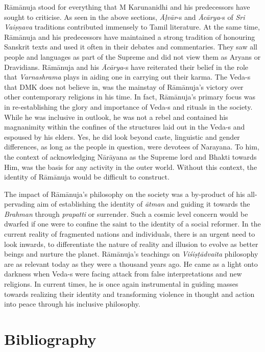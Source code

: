 Rāmānuja stood for everything that M Karunanidhi and his predecessors have sought to criticise. As seen in the above sections, \textit{Āḷvār}-s and \textit{Ācārya}-s of \textit{Sri Vaiṣņava} traditions contributed immensely to Tamil literature. At the same time, Rāmānuja and his predecessors have maintained a strong tradition of honouring Sanskrit texts and used it often in their debates and commentaries. They saw all people and languages as part of the Supreme and did not view them as Aryans or Dravidians. Rāmānuja and his \textit{Ācārya}-s have reiterated their belief in the role that \textit{Varnashrama} plays in aiding one in carrying out their karma. The Veda-s that DMK does not believe in, was the mainstay of Rāmānuja’s victory over other contemporary religions in his time. In fact, Rāmānuja’s primary focus was in re-establishing the glory and importance of Veda-s and rituals in the society. While he was inclusive in outlook, he was not a rebel and contained his magnanimity within the confines of the structures laid out in the Veda-s and espoused by his elders. Yes, he did look beyond caste, linguistic and gender differences, as long as the people in question, were devotees of Narayana. To him, the context of acknowledging Nārāyana as the Supreme lord and Bhakti towards Him, was the basis for any activity in the outer world. Without this context, the identity of Rāmānuja would be difficult to construct.

The impact of Rāmānuja’s philosophy on the society was a by-product of his all-pervading aim of establishing the identity of \textit{ātman} and guiding it towards the \textit{Brahman} through \textit{prapatti }or surrender. Such a cosmic level concern would be dwarfed if one were to confine the saint to the identity of a social reformer. In the current reality of fragmented nations and individuals, there is an urgent need to look inwards, to differentiate the nature of reality and illusion to evolve as better beings and nurture the planet. Rāmānuja’s teachings on \textit{Viśiṣṭādvaita} philosophy are as relevant today as they were a thousand years ago. He came as a light onto darkness when Veda-s were facing attack from false interpretations and new religions. In current times, he is once again instrumental in guiding masses towards realizing their identity and transforming violence in thought and action into peace through his inclusive philosophy.


\section*{Bibliography}

